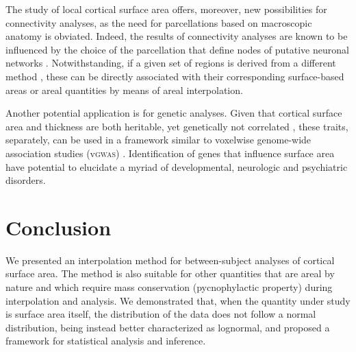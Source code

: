 The study of local cortical surface area offers, moreover, new possibilities for connectivity analyses, as the need for parcellations based on macroscopic anatomy is obviated. Indeed, the results of connectivity analyses are known to be influenced by the choice of the parcellation that define nodes of putative neuronal networks \citep{Butts2009, Rubinov2010}. Notwithstanding, if a given set of regions is derived from a different method \citep{Beckmann2009a, Nelson2010}, these can be directly associated with their corresponding surface-based areas or areal quantities by means of areal interpolation.

Another potential application is for genetic analyses. Given that cortical surface area and thickness are both heritable, yet genetically not correlated \citep{Panizzon2009, Winkler2010}, these traits, separately, can be used in a framework similar to voxelwise genome-wide association studies (v\textsc{gwas}) \citep{Stein2010}. Identification of genes that influence surface area have potential to elucidate a myriad of developmental, neurologic and psychiatric disorders.

\section{Conclusion}

We presented an interpolation method for between-subject analyses of cortical surface area. The method is also suitable for other quantities that are areal by nature and which require mass conservation (pycnophylactic property) during interpolation and analysis. We demonstrated that, when the quantity under study is surface area itself, the distribution of the data does not follow a normal distribution, being instead better characterized as lognormal, and proposed a framework for statistical analysis and inference.